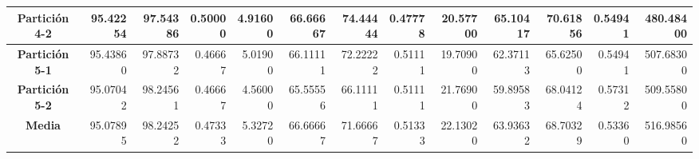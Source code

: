\documentclass[a4paper,11pt]{article}
\begin{document}
\begin{table}[H]
\begin{adjustbox}{width=1.1\textwidth}
\begin{tabular}{|c|r|r|r|r|r|r|r|r|r|r|r|r|}
  \textbf{Partición 4-2} & 95.42254 & 97.54386 & 0.50000 & 4.91600 & 66.66667 & 74.44444 & 0.47778 & 20.57700 & 65.10417 & 70.61856 & 0.54941 & 480.48400 \\ \hline
  \textbf{Partición 5-1} & 95.43860 & 97.88732 & 0.46667 & 5.01900 & 66.11111 & 72.22222 & 0.51111 & 19.70900 & 62.37113 & 65.62500 & 0.54941 & 507.68300 \\ \hline
  \textbf{Partición 5-2} & 95.07042 & 98.24561 & 0.46667 & 4.56000 & 65.55556 & 66.11111 & 0.51111 & 21.76900 & 59.89583 & 68.04124 & 0.57312 & 509.55800 \\ \hline
  \textbf{Media} & 95.07895 & 98.24252 & 0.47333 & 5.32720 & 66.66667 & 71.66667 & 0.51333 & 22.13020 & 63.93632 & 68.70329 & 0.53360 & 516.98560 \\ \hline
  \end{tabular}
  \end{adjustbox}
  \label{}
  \end{table}
\end{document}
